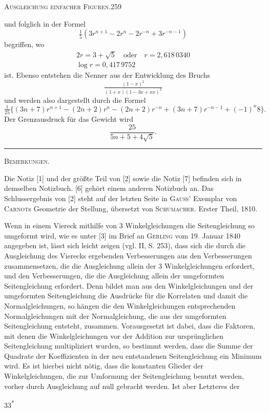 \clearpage
\noindent\mbox{}\hfill\textsc{Ausgleichung einfacher Figuren.}\hfill259\par\medskip
\noindent und folglich in der Formel
\[
\tfrac15(3r^{n+1}-2r^n-2r^{-n}+3r^{-n-1})
\]
\noindent begriffen, wo
\[
\begin{gathered}
2r=3+\sqrt5\quad\text{oder}\quad r=2{,}618\,0340\\
\log r=0{,}417\,9752
\end{gathered}
\]
\noindent ist. Ebenso entstehen die Nenner aus der Entwicklung des Bruchs
\[
\tfrac{(1-x)^2}{(1+x)(1-3x+xx)^2}
\]
\noindent und werden also dargestellt durch die Formel
\[
\tfrac1{25}\{(3n+7)r^{n+1}-(2n+2)r^n-(2n+2)r^{-n}+(3n+7)r^{-n-1}+(-1)^n8\}.
\]
Der Grenzausdruck für das Gewicht wird
\[
\frac{25}{5n+5+4\sqrt5}.
\]
\begin{center}\rule{3cm}{.4pt}\end{center}
\bigskip
\begin{center}\textsc{Bemerkungen.}\end{center}
\begingroup\footnotesize
Die Notiz [1] und der größte Teil von [2] sowie die Notiz [7] befinden sich in demselben Notizbuch. [6] gehört einem anderen Notizbuch an. Das Schlussergebnis von [2] steht auf der letzten Seite in \textsc{Gauss}’ Exemplar von \textsc{Carnot}s Geometrie der Stellung, übersetzt von \textsc{Schumacher}. Erster Theil, 1810.

Wenn in einem Viereck mithilfe von 3 Winkelgleichungen die Seitengleichung so umgeformt wird, wie es unter [3] im Brief an \textsc{Gerling} vom 19. Januar 1840 angegeben ist, lässt sich leicht zeigen (vgl. II, S. 253), dass sich die durch die Ausgleichung des Vierecks ergebenden Verbesserungen aus den Verbesserungen zusammensetzen, die die Ausgleichung allein der 3 Winkelgleichungen erfordert, und den Verbesserungen, die die Ausgleichung allein der umgeformten Seitengleichung erfordert. Denn bildet man aus den Winkelgleichungen und der umgeformten Seitengleichung die Ausdrücke für die Korrelaten und damit die Normalgleichungen, so hängen die den Winkelgleichungen entsprechenden Normalgleichungen mit der Normalgleichung, die aus der umgeformten Seitengleichung entsteht,  zusammen. Vorausgesetzt ist dabei, dass die Faktoren, mit denen die Winkelgleichungen vor der Addition zur ursprünglichen Seitengleichung multipliziert wurden, so bestimmt werden, dass die Summe der Quadrate der Koeffizienten in der neu entstandenen Seitengleichung ein Minimum wird. Es ist hierbei nicht nötig, dass die konstanten Glieder der Winkelgleichungen, die zur Umformung der Seitengleichung benutzt werden, vorher durch Ausgleichung auf null gebracht werden. Ist aber Letzteres der
\par\endgroup
\vfill\noindent\hfill33\textsuperscript{$\ast$}\hspace*{2cm}

